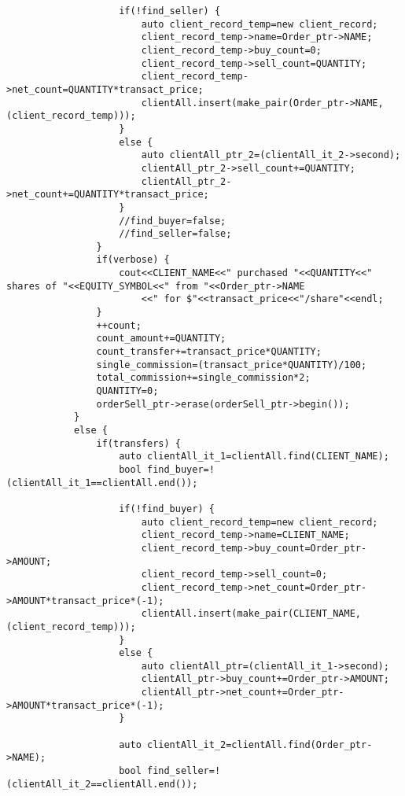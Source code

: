 \documentclass{article}
\begin{document}
\begin{spacing}{1.5}
\begin{lstlisting}
                    if(!find_seller) {
                        auto client_record_temp=new client_record;
                        client_record_temp->name=Order_ptr->NAME;
                        client_record_temp->buy_count=0;
                        client_record_temp->sell_count=QUANTITY;
                        client_record_temp->net_count=QUANTITY*transact_price;
                        clientAll.insert(make_pair(Order_ptr->NAME, (client_record_temp)));
                    }
                    else {
                        auto clientAll_ptr_2=(clientAll_it_2->second);
                        clientAll_ptr_2->sell_count+=QUANTITY;
                        clientAll_ptr_2->net_count+=QUANTITY*transact_price;
                    }
                    //find_buyer=false;
                    //find_seller=false;
                }
                if(verbose) {
                    cout<<CLIENT_NAME<<" purchased "<<QUANTITY<<" shares of "<<EQUITY_SYMBOL<<" from "<<Order_ptr->NAME
                        <<" for $"<<transact_price<<"/share"<<endl;
                }
                ++count;
                count_amount+=QUANTITY;
                count_transfer+=transact_price*QUANTITY;
                single_commission=(transact_price*QUANTITY)/100;
                total_commission+=single_commission*2;
                QUANTITY=0;
                orderSell_ptr->erase(orderSell_ptr->begin());
            }
            else {
                if(transfers) {
                    auto clientAll_it_1=clientAll.find(CLIENT_NAME);
                    bool find_buyer=!(clientAll_it_1==clientAll.end());

                    if(!find_buyer) {
                        auto client_record_temp=new client_record;
                        client_record_temp->name=CLIENT_NAME;
                        client_record_temp->buy_count=Order_ptr->AMOUNT;
                        client_record_temp->sell_count=0;
                        client_record_temp->net_count=Order_ptr->AMOUNT*transact_price*(-1);
                        clientAll.insert(make_pair(CLIENT_NAME, (client_record_temp)));
                    }
                    else {
                        auto clientAll_ptr=(clientAll_it_1->second);
                        clientAll_ptr->buy_count+=Order_ptr->AMOUNT;
                        clientAll_ptr->net_count+=Order_ptr->AMOUNT*transact_price*(-1);
                    }

                    auto clientAll_it_2=clientAll.find(Order_ptr->NAME);
                    bool find_seller=!(clientAll_it_2==clientAll.end());


\end{lstlisting}
\end{spacing}
\end{document}
